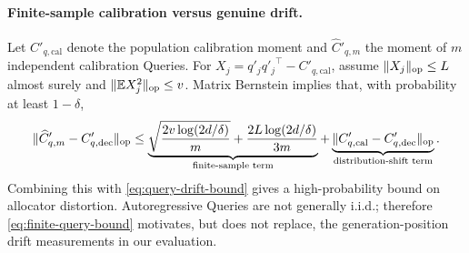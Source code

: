 \paragraph{Finite-sample calibration versus genuine drift.}
Let $C'_{q,\mathrm{cal}}$ denote the population calibration moment and
$\widehat C'_{q,m}$ the moment of $m$ independent calibration Queries.
For $X_j=q'_j{q'_j}^\top-C'_{q,\mathrm{cal}}$, assume
$\|X_j\|_{\mathrm{op}}\le L$ almost surely and
$\|\mathbb E X_j^2\|_{\mathrm{op}}\le v$.
Matrix Bernstein implies that, with probability at least $1-\delta$,
\begin{equation}
 \|\widehat C'_{q,m}-C'_{q,\mathrm{dec}}\|_{\mathrm{op}}
 \le
 \underbrace{\sqrt{\frac{2v\log(2d/\delta)}{m}}+
 \frac{2L\log(2d/\delta)}{3m}}_{\text{finite-sample term}}
 +\underbrace{\|C'_{q,\mathrm{cal}}-C'_{q,\mathrm{dec}}\|_{\mathrm{op}}}
 _{\text{distribution-shift term}}.
 \label{eq:finite-query-bound}
\end{equation}
Combining this with \cref{eq:query-drift-bound} gives a high-probability
bound on allocator distortion.  Autoregressive Queries are not generally
i.i.d.; therefore \cref{eq:finite-query-bound} motivates, but does not
replace, the generation-position drift measurements in our evaluation.

